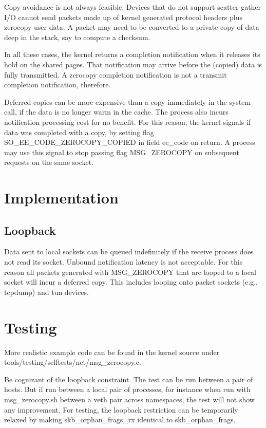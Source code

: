 \documentclass[a4paper,8pt,english]{sphinxmanual}
\begin{document}
Copy avoidance is not always feasible. Devices that do not support
scatter-gather I/O cannot send packets made up of kernel generated
protocol headers plus zerocopy user data. A packet may need to be
converted to a private copy of data deep in the stack, say to compute
a checksum.

In all these cases, the kernel returns a completion notification when
it releases its hold on the shared pages. That notification may arrive
before the (copied) data is fully transmitted. A zerocopy completion
notification is not a transmit completion notification, therefore.

Deferred copies can be more expensive than a copy immediately in the
system call, if the data is no longer warm in the cache. The process
also incurs notification processing cost for no benefit. For this
reason, the kernel signals if data was completed with a copy, by
setting flag SO\_EE\_CODE\_ZEROCOPY\_COPIED in field ee\_code on return.
A process may use this signal to stop passing flag MSG\_ZEROCOPY on
subsequent requests on the same socket.


\section{Implementation}
\label{networking/msg_zerocopy:implementation}

\subsection{Loopback}
\label{networking/msg_zerocopy:loopback}
Data sent to local sockets can be queued indefinitely if the receive
process does not read its socket. Unbound notification latency is not
acceptable. For this reason all packets generated with MSG\_ZEROCOPY
that are looped to a local socket will incur a deferred copy. This
includes looping onto packet sockets (e.g., tcpdump) and tun devices.


\section{Testing}
\label{networking/msg_zerocopy:testing}
More realistic example code can be found in the kernel source under
tools/testing/selftests/net/msg\_zerocopy.c.

Be cognizant of the loopback constraint. The test can be run between
a pair of hosts. But if run between a local pair of processes, for
instance when run with msg\_zerocopy.sh between a veth pair across
namespaces, the test will not show any improvement. For testing, the
loopback restriction can be temporarily relaxed by making
skb\_orphan\_frags\_rx identical to skb\_orphan\_frags.



\renewcommand{\indexname}{Index}
\printindex
\end{document}
